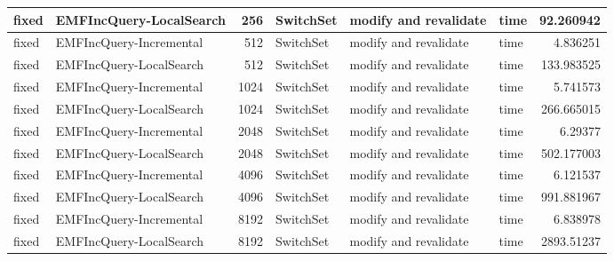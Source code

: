 \begin{table}
\begin{tabular}{| l | l | r | l | l | l | r |}
fixed & EMFIncQuery-LocalSearch & 256 & SwitchSet & modify and revalidate & time & 92.260942\\\hline
fixed & EMFIncQuery-Incremental & 512 & SwitchSet & modify and revalidate & time & 4.836251\\\hline
fixed & EMFIncQuery-LocalSearch & 512 & SwitchSet & modify and revalidate & time & 133.983525\\\hline
fixed & EMFIncQuery-Incremental & 1024 & SwitchSet & modify and revalidate & time & 5.741573\\\hline
fixed & EMFIncQuery-LocalSearch & 1024 & SwitchSet & modify and revalidate & time & 266.665015\\\hline
fixed & EMFIncQuery-Incremental & 2048 & SwitchSet & modify and revalidate & time & 6.29377\\\hline
fixed & EMFIncQuery-LocalSearch & 2048 & SwitchSet & modify and revalidate & time & 502.177003\\\hline
fixed & EMFIncQuery-Incremental & 4096 & SwitchSet & modify and revalidate & time & 6.121537\\\hline
fixed & EMFIncQuery-LocalSearch & 4096 & SwitchSet & modify and revalidate & time & 991.881967\\\hline
fixed & EMFIncQuery-Incremental & 8192 & SwitchSet & modify and revalidate & time & 6.838978\\\hline
fixed & EMFIncQuery-LocalSearch & 8192 & SwitchSet & modify and revalidate & time & 2893.51237\\\hline


\end{tabular}
\end{table}
